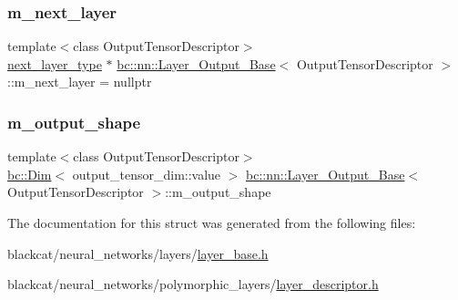 \subsubsection{\texorpdfstring{m\+\_\+next\+\_\+layer}{m\_next\_layer}}
{\footnotesize\ttfamily template$<$class Output\+Tensor\+Descriptor$>$ \\
\hyperlink{structbc_1_1nn_1_1Layer__Output__Base_a0c791bc57bcc78e8d82e8a5375f1c584}{next\+\_\+layer\+\_\+type} $\ast$ \hyperlink{structbc_1_1nn_1_1Layer__Output__Base}{bc\+::nn\+::\+Layer\+\_\+\+Output\+\_\+\+Base}$<$ Output\+Tensor\+Descriptor $>$\+::m\+\_\+next\+\_\+layer = nullptr\hspace{0.3cm}{\ttfamily [protected]}}

\mbox{\label{structbc_1_1nn_1_1Layer__Output__Base_a3cc4d51833f2a19f4f6dc751727a7a2c}} 
\subsubsection{\texorpdfstring{m\+\_\+output\+\_\+shape}{m\_output\_shape}}
{\footnotesize\ttfamily template$<$class Output\+Tensor\+Descriptor$>$ \\
\hyperlink{structbc_1_1Dim}{bc\+::\+Dim}$<$ output\+\_\+tensor\+\_\+dim\+::value $>$ \hyperlink{structbc_1_1nn_1_1Layer__Output__Base}{bc\+::nn\+::\+Layer\+\_\+\+Output\+\_\+\+Base}$<$ Output\+Tensor\+Descriptor $>$\+::m\+\_\+output\+\_\+shape\hspace{0.3cm}{\ttfamily [protected]}}



The documentation for this struct was generated from the following files\+:\begin{DoxyCompactItemize}
\item 
blackcat/neural\+\_\+networks/layers/\hyperlink{layer__base_8h}{layer\+\_\+base.\+h}\item 
blackcat/neural\+\_\+networks/polymorphic\+\_\+layers/\hyperlink{layer__descriptor_8h}{layer\+\_\+descriptor.\+h}\end{DoxyCompactItemize}
